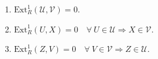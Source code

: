 \documentclass[preview]{standalone}
\begin{document}
\begin{center}
\begin{enumerate} \item $\text{Ext}^1_R (\mathcal{U}, \mathcal{V}) = 0$. \item $\text{Ext}^1_R (U, X) = 0 \quad \forall \ U\in\mathcal{U} \Rightarrow X\in\mathcal{V}$. \item $\text{Ext}^1_R (Z, V) = 0 \quad \forall \ V\in\mathcal{V} \Rightarrow Z\in\mathcal{U}$. \end{enumerate}
\end{center}
\end{document}
